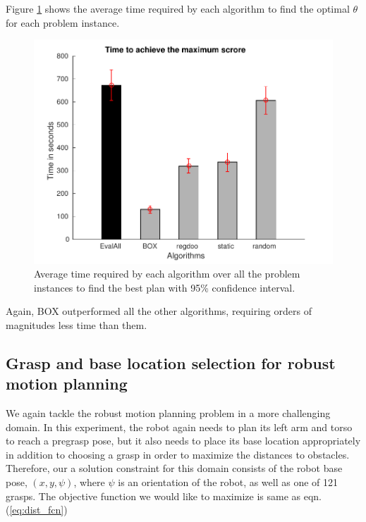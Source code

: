 Figure \ref{fig:time_reqd_for_opt_grasp} shows the average time required
by each algorithm to find the optimal $\theta$ for each problem instance. 
\begin{figure}[htb]
\centering
\includegraphics[scale=0.5]{./figures/only_grasp_opt_time_plot.pdf}
\caption{ Average time required by each algorithm over all the problem instances to find the best plan with 95\% confidence interval. }
\label{fig:time_reqd_for_opt_grasp}
\end{figure} 
Again, BOX outperformed all the other algorithms, requiring orders
of magnitudes less time than them. 
\fi


\subsection{Grasp and base location selection for robust motion planning}
We again tackle the robust motion planning problem in a more challenging domain.
In this experiment, the robot again needs to plan its left arm and torso
to reach a pregrasp pose, but it also needs to place its base location appropriately 
in addition to choosing a grasp in order to maximize the distances to obstacles. 
Therefore, our a solution constraint for this domain consists of the 
robot base pose, $(x,y,\psi)$,  where $\psi$ is an orientation of the robot, 
as well as one of 121 grasps.  The objective function we would like to
maximize is same as eqn. (\ref{eq:dist_fcn})


